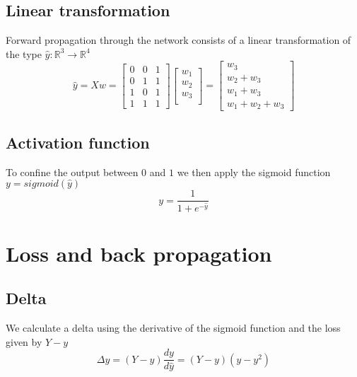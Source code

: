 \documentclass[10pt,a4paper]{article}
\begin{document}
\subsection{Linear transformation}
Forward propagation through the network consists of a linear transformation of the type $\hat{y}: \mathbb{R}^3 \to \mathbb{R}^4$
\begin{equation}
	\hat{y} = Xw =
	\begin{bmatrix}
		0 & 0 & 1 \\
		0 & 1 & 1 \\
		1 & 0 & 1 \\
		1 & 1 & 1
	\end{bmatrix}
	\begin{bmatrix}
		w_1 \\
		w_2 \\
		w_3 \\
	\end{bmatrix}
	=
	\begin{bmatrix}
		w_3 \\
		w_2 + w_3 \\
		w_1 + w_3 \\
		w_1 + w_2 + w_3
	\end{bmatrix}
\end{equation}
\subsection{Activation function}
To confine the output between $0$ and $1$ we then apply the sigmoid function $y = sigmoid(\hat{y})$
\begin{equation}
	y = \frac{1}{1+e^{-\hat{y}}}
\end{equation}

\newpage

\section{Loss and back propagation}
\subsection{Delta}
We calculate a delta using the derivative of the sigmoid function and the loss given by $Y-y$
\begin{equation}
	\Delta{y} = (Y-y)\frac{dy}{d\hat{y}} = (Y-y)(y-y^2)
\end{equation}
\end{document}
